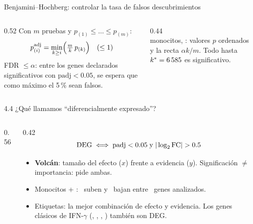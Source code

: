 \begin{frame}{Benjamini--Hochberg: controlar la tasa de falsos descubrimientos}
  \begin{columns}[T]
    \begin{column}{0.52\linewidth}
      Con $m$ pruebas y $p_{(1)}\le\dots\le p_{(m)}$:
      \[ p^{\mathrm{adj}}_{(i)}=\min_{k\ge i}\Bigl(\tfrac{m}{k}\,p_{(k)}\Bigr)\quad(\le1) \]
      \small
      \alert{FDR} $\le\alpha$: entre los genes declarados significativos con $\mathrm{padj}<0.05$, se espera que como máximo el 5\,\% sean falsos.\\[0.15cm]
      \scriptsize
      
    \end{column}
    \begin{column}{0.44\linewidth}
      \\[-0.1cm]
      \scriptsize monocitos, \IFNg: valores $p$ ordenados y la recta $\alpha k/m$. Todo hasta $k^*=6\,585$ es significativo.
    \end{column}
  \end{columns}
\end{frame}

\begin{frame}{4.4 ¿Qué llamamos ``diferencialmente expresado''?}
  \begin{columns}[c]
    \begin{column}{0.56\linewidth}
    \end{column}
    \begin{column}{0.42\linewidth}\small
      \[
        \text{DEG}\;\Longleftrightarrow\;\mathrm{padj}<0.05\;\text{y}\;|\lfc|>0.5
      \]
      \begin{itemize}\setlength\itemsep{3pt}
        \item \textbf{Volcán}: tamaño del efecto ($x$) frente a evidencia ($y$). Significación $\neq$ importancia: pide ambas.
        \item Monocitos + \IFNg: \alert{\numnup\ suben} y \alert{\numndown\ bajan} entre \numntested\ genes analizados.
        \item Etiquetas: la mejor combinación de efecto y evidencia. Los genes clásicos de IFN-$\gamma$ (, , , ) también son DEG.
      \end{itemize}
    \end{column}
  \end{columns}
\end{frame}

